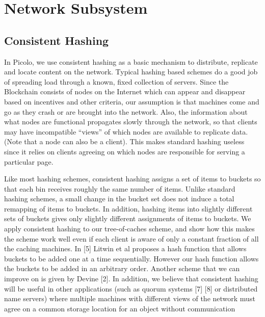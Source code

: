 \section{Network Subsystem} 

\subsection{Consistent Hashing}

In Picolo, we use consistent hashing as a basic mechanism to distribute, replicate and locate content on the network.
Typical hashing based schemes do a good job of spreading load through a known, fixed collection of servers. Since the
Blockchain consists of nodes on the Internet which can appear and disappear based on incentives and other criteria, our
assumption is that machines come and go as they crash or are brought into the network. Also,
the information about what nodes are functional propagates slowly through the
network, so that clients may have incompatible “views” of which nodes are available to replicate data. (Note that a
node can also be a client). This makes standard hashing useless since it relies on clients agreeing on which nodes are responsible for serving a particular
page.


Like most hashing schemes, consistent hashing assigns a set of items to buckets so that
each bin receives roughly the same number of items.  Unlike standard hashing schemes, a small change in the bucket set
does not induce a total remapping of items to buckets. In addition, hashing items into slightly different sets of
buckets gives only slightly different assignments of items to buckets. We apply consistent hashing to our tree-of-caches
scheme, and show how this makes the scheme work well even if each client is aware of only a constant fraction of all the
caching machines. In [5] Litwin et al proposes a hash function that allows buckets to be added one at a time
sequentially. However our hash function allows the buckets to be added in an arbitrary order. Another scheme that we can
improve on is given by Devine [2]. In addition, we believe that consistent hashing will be useful in other applications
(such as quorum systems [7] [8] or distributed name servers) where multiple machines with different views of the network
must agree on a common storage location for an object without communication

